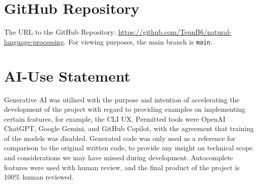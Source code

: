 \documentclass[12pt,a4paper,english]{article}
\begin{document}
\newpage
\printbibliography

\suppressfloats[t]
\newpage
\appendix
\section{GitHub Repository}

The URL to the GitHub Repository: \href{https://github.com/TeunB6/natural-language-processing}{https://github.com/TeunB6/natural-language-processing}. For viewing purposes, the main branch is \texttt{main}.

\section{AI-Use Statement}

Generative AI was utilised with the purpose and intention of accelerating the development of the project with regard to providing examples on implementing certain features, for example, the CLI UX. Permitted tools were OpenAI ChatGPT, Google Gemini, and GitHub Copilot, with the agreement that training of the models was disabled. Generated code was only used as a reference for comparison to the original written code, to provide any insight on technical scope and considerations we may have missed during development. Autocomplete features were used with human review, and the final product of the project is 100\% human reviewed.
\end{document}
